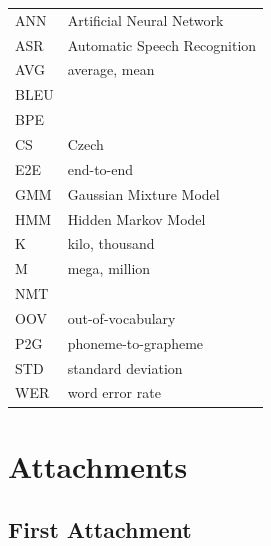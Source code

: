 \documentclass[12pt,a4paper]{report}
\let\openright=\clearpage
\begin{document}
    \begin{tabular}{ll}
    	ANN & Artificial Neural Network \\
        ASR & Automatic Speech Recognition \\
        AVG & average, mean\\
        BLEU & \\
        BPE & \\
        CS & Czech \\
        E2E & end-to-end \\
        GMM & Gaussian Mixture Model \\
        HMM & Hidden Markov Model \\
        K & kilo, thousand \\
        M & mega, million \\
        NMT & \\
        OOV & out-of-vocabulary \\
        P2G & phoneme-to-grapheme \\
        STD & standard deviation \\
        WER & word error rate \\
        
    \end{tabular}

\appendix
\chapter{Attachments}

\section{First Attachment}

\openright
\end{document}
